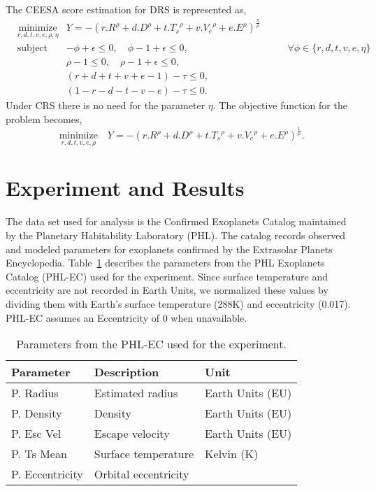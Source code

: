 \documentclass[10pt]{article}
\begin{document}
The CEESA score estimation for DRS is represented as,
\begin{equation}\label{eq:ceesadrs}
  \begin{aligned}
    & \underset{r,d,t,v,e,\rho,\eta}{\text{minimize}}
    & Y = {-}{(r.R^\rho+d.D^\rho+t.{T_s}^\rho+v.{V_e}^\rho+e.E^\rho)}^{\frac{\eta}{\rho}}\\
    & \text{subject to}
    &   {-}\phi + \epsilon \leq 0,\quad\phi - 1 + \epsilon \leq 0, &\quad\quad \forall \phi\in\{r,d,t,v,e,\eta\}\\
    && \rho - 1 \leq 0,\quad \rho - 1 + \epsilon \leq 0,\\
    && (r+d+t+v+e-1) - \tau \leq 0,\\
    && (1-r-d-t-v-e) - \tau \leq 0.
  \end{aligned}
\end{equation}
Under CRS there is no need for the parameter $\eta$. The objective function for the problem becomes,
\begin{equation}\label{eq:ceesacrs}
  \underset{r,d,t,v,e,\rho}{\text{minimize}}\quad
  Y = {-}{(r.R^\rho+d.D^\rho+t.{T_s}^\rho+v.{V_e}^\rho+e.E^\rho)}^{\frac{1}{\rho}}.
\end{equation}


\section{Experiment and Results}

The data set used for analysis is the Confirmed Exoplanets Catalog maintained by the Planetary Habitability Laboratory
(PHL). The catalog records observed and modeled parameters for exoplanets confirmed by the Extrasolar Planets
Encyclopedia. Table~\ref{tab:param} describes the parameters from the PHL Exoplanets Catalog (PHL-EC) used for the
experiment. Since surface temperature and eccentricity are not recorded in Earth Units, we normalized these values by
dividing them with Earth's surface temperature (288K) and eccentricity (0.017). PHL-EC assumes an Eccentricity of 0 when
unavailable.

\begin{table}
  \begin{center}
    \begin{tabular}{l l l}
      \toprule
      \textbf{Parameter} & \textbf{Description} & \textbf{Unit}\\
      \midrule
      P. Radius       & Estimated radius      & Earth Units (EU)\\
      P. Density      & Density               & Earth Units (EU)\\
      P. Esc Vel      & Escape velocity       & Earth Units (EU)\\
      P. Ts Mean      & Surface temperature   & Kelvin (K)\\
      P. Eccentricity & Orbital eccentricity\\
      \bottomrule
    \end{tabular}
  \end{center}
  \caption{Parameters from the PHL-EC used for the experiment.}\label{tab:param}
\end{table}
\end{document}
